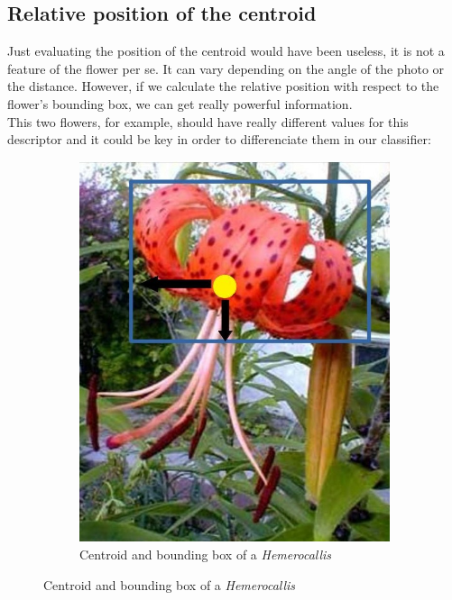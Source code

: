 \documentclass[11]{article}
\begin{document}
\subsection{Relative position of the centroid}

Just evaluating the position of the centroid would have been useless, it is not a feature of the flower per se. It can vary depending on the angle of the photo or the distance. However, if we calculate the relative position with respect to the flower's bounding box, we can get really powerful information. 
\\

This two flowers, for example, should have really different values for this descriptor and it could be key in order to differenciate them in our classifier:
\begin{figure}[H]
    \begin{subfigure}[t]{0.45\textwidth}
    \centering
  \includegraphics[scale=0.2]{images/hemerocallisCentroid.jpg}
    \caption{Centroid and bounding box of a \textit{Hemerocallis}}
    \label{centroidHemerocallis}
    \end{subfigure}

\end{figure}
\end{document}
